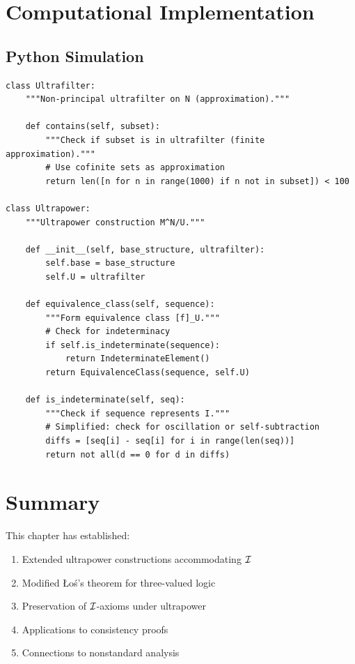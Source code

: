 \section{Computational Implementation}

\subsection{Python Simulation}

\begin{verbatim}
class Ultrafilter:
    """Non-principal ultrafilter on N (approximation)."""
    
    def contains(self, subset):
        """Check if subset is in ultrafilter (finite approximation)."""
        # Use cofinite sets as approximation
        return len([n for n in range(1000) if n not in subset]) < 100

class Ultrapower:
    """Ultrapower construction M^N/U."""
    
    def __init__(self, base_structure, ultrafilter):
        self.base = base_structure
        self.U = ultrafilter
    
    def equivalence_class(self, sequence):
        """Form equivalence class [f]_U."""
        # Check for indeterminacy
        if self.is_indeterminate(sequence):
            return IndeterminateElement()
        return EquivalenceClass(sequence, self.U)
    
    def is_indeterminate(self, seq):
        """Check if sequence represents I."""
        # Simplified: check for oscillation or self-subtraction
        diffs = [seq[i] - seq[i] for i in range(len(seq))]
        return not all(d == 0 for d in diffs)
\end{verbatim}

\section{Summary}

This chapter has established:

\begin{enumerate}
    \item Extended ultrapower constructions accommodating $\mathcal{I}$
    \item Modified Łoś's theorem for three-valued logic
    \item Preservation of $\mathcal{I}$-axioms under ultrapower
    \item Applications to consistency proofs
    \item Connections to nonstandard analysis
\end{enumerate}

